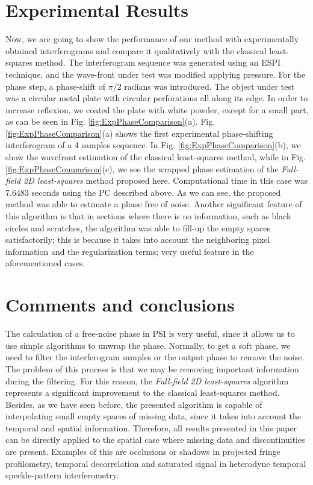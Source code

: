 \section{Experimental Results}

Now, we are going to show the performance of our method with experimentally 
obtained interferograms and compare it qualitatively with the classical 
least-squares method. The interferogram sequence was generated using an ESPI 
technique, and the wave-front under test was modified applying pressure. For 
the phase step, a phase-shift of $\pi/2$ radians was introduced. The object
under test was a circular metal plate with circular perforations all along
its edge. In order to increase reflexion, we coated the plate with white
powder, except for a small part, as can be seen in Fig.
\ref{fig:ExpPhaseComparison}(a). Fig. \ref{fig:ExpPhaseComparison}(a) shows the
first experimental phase-shifting interferogram of a 4 samples sequence. In
Fig. \ref{fig:ExpPhaseComparison}(b), we show the wavefront estimation of the 
classical least-squares method, while in Fig. \ref{fig:ExpPhaseComparison}(c), we 
see the wrapped phase estimation of the \textit{Full-field 2D least-squares} 
method proposed here. Computational time in this case was 7.6483 seconds
using the PC described above. As we can see, the proposed method was able to
estimate a phase free of noise. Another significant feature of this algorithm is
that in sections where there is no information, such as black circles and
scratches, the algorithm was able to fill-up the empty spaces satisfactorily;
this is because it takes into account the neighboring pixel information and the
regularization terms; very useful feature in the aforementioned cases.

\section{Comments and conclusions}

The calculation of a free-noise phase in PSI is very useful, since it allows 
us to use simple algorithms to unwrap the phase. Normally, to get a soft phase, 
we need to filter the interferogram samples or the output phase to 
remove the noise. The problem of this process is that we may be removing 
important information during the filtering. For this reason, the 
\textit{Full-field 2D least-squares} algorithm represents a significant 
improvement to the classical least-squares method. Besides, as we have seen
before, the presented algorithm is capable of interpolating small empty spaces
of missing data, since it takes into account the temporal and spatial
information. Therefore, all results presented in this paper can be directly
applied to the spatial case where missing data and discontinuities are present.
Examples of this are occlusions or shadows in projected fringe profilometry,
temporal decorrelation and saturated signal in heterodyne temporal
speckle-pattern interferometry.


